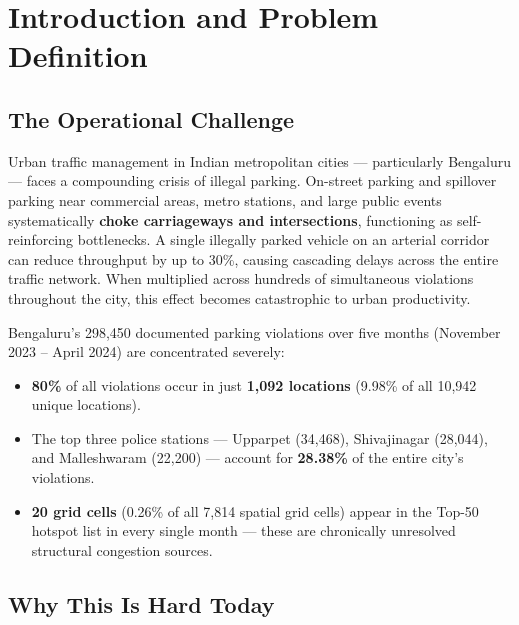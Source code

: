\documentclass[12pt,a4paper]{article}
\begin{document}
\vspace{0.5cm}
\newpage
\tableofcontents
\newpage

\section{Introduction and Problem Definition}

\subsection{The Operational Challenge}

Urban traffic management in Indian metropolitan cities — particularly Bengaluru — faces a compounding crisis of illegal parking. On-street parking and spillover parking near commercial areas, metro stations, and large public events systematically \textbf{choke carriageways and intersections}, functioning as self-reinforcing bottlenecks. A single illegally parked vehicle on an arterial corridor can reduce throughput by up to 30\%, causing cascading delays across the entire traffic network. When multiplied across hundreds of simultaneous violations throughout the city, this effect becomes catastrophic to urban productivity.

Bengaluru's 298,450 documented parking violations over five months (November 2023 -- April 2024) are concentrated severely:
\begin{itemize}
    \item \textbf{80\%} of all violations occur in just \textbf{1,092 locations} (9.98\% of all 10,942 unique locations).
    \item The top three police stations — Upparpet (34,468), Shivajinagar (28,044), and Malleshwaram (22,200) — account for \textbf{28.38\%} of the entire city's violations.
    \item \textbf{20 grid cells} (0.26\% of all 7,814 spatial grid cells) appear in the Top-50 hotspot list in every single month — these are chronically unresolved structural congestion sources.
\end{itemize}

\subsection{Why This Is Hard Today}
\end{document}

